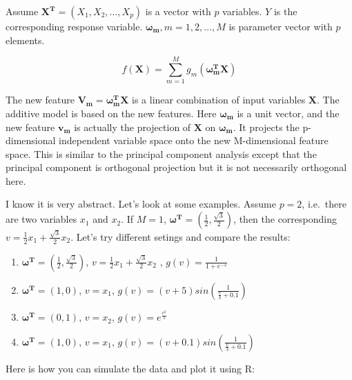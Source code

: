 \documentclass[12pt,]{krantz}
\begin{document}
Assume \(\mathbf{X^{T}}=(X_1,X_2,\dots,X_p)\) is a vector with \(p\) variables. \(Y\) is the corresponding response variable. \(\mathbf{\omega_{m}},m=1,2,\dots,M\) is parameter vector with \(p\) elements.

\[f(\mathbf{X})=\sum_{m=1}^{M}g_{m}(\mathbf{\omega_{m}^{T}X})\]

The new feature \(\mathbf{V_{m}}=\mathbf{\omega_{m}^{T}X}\) is a linear combination of input variables \(\mathbf{X}\). The additive model is based on the new features. Here \(\mathbf{\omega_{m}}\) is a unit vector, and the new feature \(\mathbf{v_m}\) is actually the projection of \(\mathbf{X}\) on \(\mathbf{\omega_{m}}\). It projects the p-dimensional independent variable space onto the new M-dimensional feature space. This is similar to the principal component analysis except that the principal component is orthogonal projection but it is not necessarily orthogonal here.

I know it is very abstract. Let's look at some examples. Assume \(p=2\), i.e.~there are two variables \(x_1\) and \(x_2\). If \(M=1\), \(\mathbf{\omega^{T}}=(\frac{1}{2},\frac{\sqrt{3}}{2})\), then the corresponding \(v=\frac{1}{2}x_{1}+\frac{\sqrt{3}}{2}x_{2}\). Let's try different setings and compare the results:

\begin{enumerate}
\def\labelenumi{\arabic{enumi}.}
\item
  \(\mathbf{\omega^{T}}=(\frac{1}{2},\frac{\sqrt{3}}{2})\), \(v=\frac{1}{2}x_{1}+\frac{\sqrt{3}}{2}x_{2}\) , \(g(v)=\frac{1}{1+e^{-v}}\)
\item
  \(\mathbf{\omega^{T}}=(1,0)\), \(v = x_1\), \(g(v)=(v+5)sin(\frac{1}{\frac{v}{3}+0.1})\)
\item
  \(\mathbf{\omega^{T}}=(0,1)\), \(v = x_2\), \(g(v)=e^{\frac{v^2}{5}}\)
\item
  \(\mathbf{\omega^{T}}=(1,0)\), \(v = x_1\), \(g(v)=(v+0.1)sin(\frac{1}{\frac{v}{3}+0.1})\)
\end{enumerate}

Here is how you can simulate the data and plot it using R:
\end{document}
